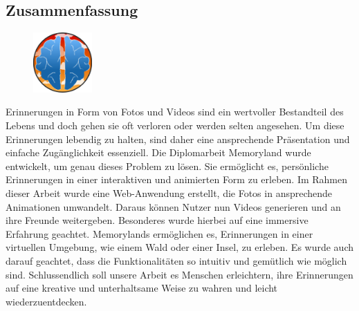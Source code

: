 \newpage
\begin{spacing}{1}
    \chapter*{Zusammenfassung}
\end{spacing}
\begin{figure}
    \begin{center}
      \includegraphics[width=0.2\textwidth]{pics/memoryland-logo.png}
    \end{center}
\end{figure}
Erinnerungen in Form von Fotos und Videos sind ein wertvoller Bestandteil des Lebens und doch
gehen sie oft verloren oder werden selten angesehen. Um diese Erinnerungen lebendig zu halten,
sind daher eine ansprechende Präsentation und einfache Zugänglichkeit essenziell.
\newline
Die Diplomarbeit Memoryland wurde entwickelt, um genau dieses Problem zu lösen. Sie ermöglicht es, 
persönliche Erinnerungen in einer interaktiven und animierten Form zu erleben. Im Rahmen dieser 
Arbeit wurde eine Web-Anwendung erstellt, die Fotos in ansprechende Animationen umwandelt. 
Daraus können Nutzer nun Videos generieren und an ihre Freunde weitergeben.
\newline
Besonderes wurde hierbei auf eine immersive Erfahrung geachtet. Memorylands ermöglichen es, 
Erinnerungen in einer virtuellen Umgebung, wie einem Wald oder einer Insel, zu erleben. Es
wurde auch darauf geachtet, dass die Funktionalitäten so intuitiv und gemütlich wie möglich
sind.
\newline
Schlussendlich soll unsere Arbeit es Menschen erleichtern, ihre Erinnerungen auf eine 
kreative und unterhaltsame Weise zu wahren und leicht wiederzuentdecken.

